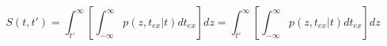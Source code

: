 \begin{equation}
S(t,t') = \int_{t'}^{\infty} \left[ \int_{-\infty}^\infty p(z,t_{ex}|t) dt_{ex}\right] dz =\int_{t'}^{\infty} \left[ \int_{-\infty}^\infty p(z,t_{ex}|t) dt_{ex}\right] dz
\end{equation}